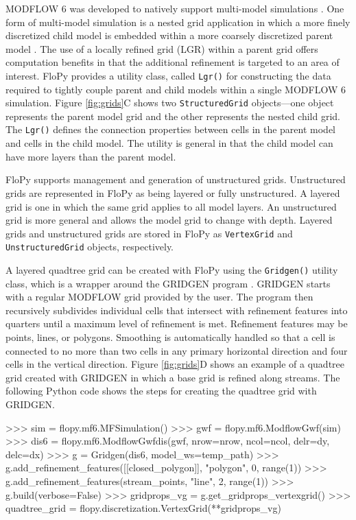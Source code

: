 \documentclass[11pt, oneside]{article}  	%
\begin{document}
MODFLOW 6 was developed to natively support multi-model simulations \citep{modflow6framework}. One form of multi-model simulation is a nested grid application in which a more finely discretized child model is embedded within a more coarsely discretized parent model \citep{modflowlgr, vilhelmsen2012evaluation, modflowlgr2}. The use of a locally refined grid (LGR) within a parent grid offers computation benefits in that the additional refinement is targeted to an area of interest. FloPy provides a utility class, called \texttt{Lgr()} for constructing the data required to tightly couple parent and child models within a single MODFLOW 6 simulation.  Figure \ref{fig:grids}C shows two \texttt{StructuredGrid} objects---one object represents the parent model grid and the other represents the nested child grid. The \texttt{Lgr()} defines the connection properties between cells in the parent model and cells in the child model. The utility is general in that the child model can have more layers than the parent model.

FloPy supports management and generation of unstructured grids. Unstructured grids are represented in FloPy as being layered or fully unstructured. A layered grid is one in which the same grid applies to all model layers. An unstructured grid is more general and allows the model grid to change with depth. Layered grids and unstructured grids are stored in FloPy as \texttt{VertexGrid} and \texttt{UnstructuredGrid} objects, respectively.

A layered quadtree grid can be created with FloPy using the \texttt{Gridgen()} utility class, which is a wrapper around the GRIDGEN program \citep{gridgen}. GRIDGEN starts with a regular MODFLOW grid provided by the user. The program then recursively subdivides individual cells that intersect with refinement features into quarters until a maximum level of refinement is met. Refinement features may be points, lines, or polygons. Smoothing is automatically handled so that a cell is connected to no more than two cells in any primary horizontal direction and four cells in the vertical direction.  Figure \ref{fig:grids}D shows an example of a quadtree grid created with GRIDGEN in which a base grid is refined along streams. The following Python code shows the steps for creating the quadtree grid with GRIDGEN.

\begin{python}
>>> sim = flopy.mf6.MFSimulation()
>>> gwf = flopy.mf6.ModflowGwf(sim)
>>> dis6 = flopy.mf6.ModflowGwfdis(gwf, nrow=nrow, ncol=ncol, delr=dy, delc=dx)
>>> g = Gridgen(dis6, model_ws=temp_path)
>>> g.add_refinement_features([[closed_polygon]], "polygon", 0, range(1))
>>> g.add_refinement_features(stream_points, "line", 2, range(1))
>>> g.build(verbose=False)
>>> gridprops_vg = g.get_gridprops_vertexgrid()
>>> quadtree_grid = flopy.discretization.VertexGrid(**gridprops_vg)
\end{python}
\end{document}
